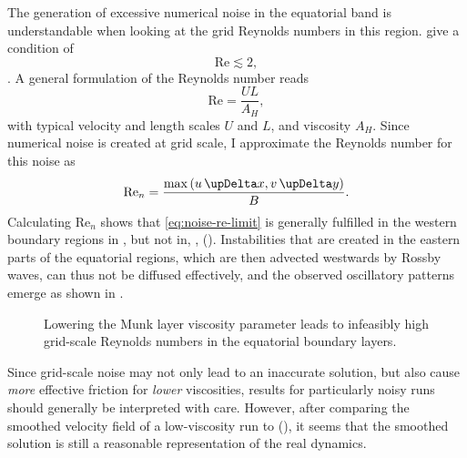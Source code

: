 The generation of excessive numerical noise in the equatorial band is understandable when looking at the grid Reynolds numbers in this region. \citet{bryanvisc} give a condition of
%
\begin{equation}
\text{Re} \lesssim 2, \label{eq:noise-re-limit}
\end{equation}
%
. A general formulation of the Reynolds number reads
%
\begin{equation}
\text{Re} = \frac{U L}{A_H},
\end{equation}
%
with typical velocity and length scales \(U\) and \(L\), and viscosity \(A_H\). Since numerical noise is created at grid scale, I approximate the Reynolds number for this noise as
%
\begin{equation}
\text{Re}_n = \frac{\max\left(u \updel x, v \updel y\right)}{B}.
\end{equation}
%
Calculating \(\text{Re}_n\) shows that \eqref{eq:noise-re-limit} is generally fulfilled in the western boundary regions in , but not in, \eg,   (). Instabilities that are created in the eastern parts of the equatorial regions, which are then advected westwards by Rossby waves, can thus not be diffused effectively, and the observed oscillatory patterns emerge as shown in .
%
\begin{figure}
 	\caption[Grid-scale Reynolds numbers in the low-viscosity runs.]{Lowering the Munk layer viscosity parameter leads to infeasibly high grid-scale Reynolds numbers in the equatorial boundary layers.}
 	\label{fig:reynolds}
\end{figure}

Since grid-scale noise may not only lead to an inaccurate solution, but also cause \emph{more} effective friction for \emph{lower} viscosities, results for particularly noisy runs should generally be interpreted with care. However, after comparing the smoothed velocity field of a low-viscosity run to  (), it seems that the smoothed solution is still a reasonable representation of the real dynamics.

\clearpage
